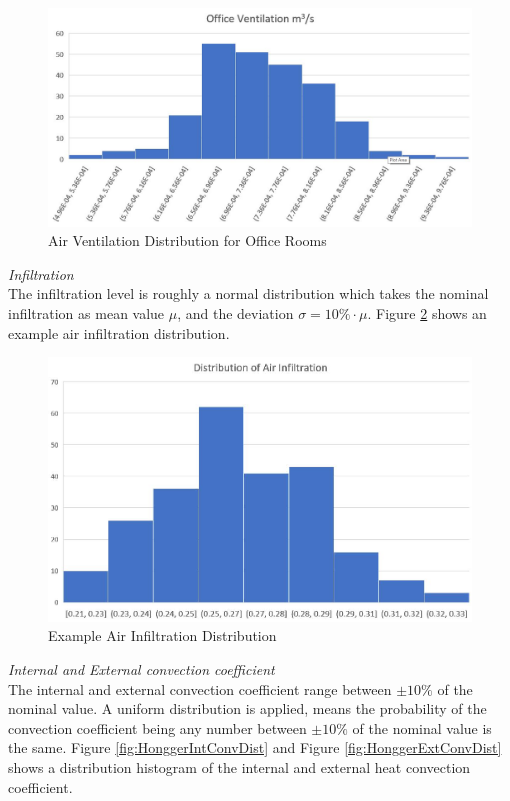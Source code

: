\documentclass[a4paper, oneside]{discothesis}
\begin{document}
			\begin{figure}[ht!]
			\centering
			\includegraphics[scale=0.45]{Office_Vent.jpg}
			\caption{Air Ventilation Distribution for Office Rooms}
			\label{fig:VentDist}
			\end{figure}
						
		\textit{Infiltration}\\
			The infiltration level is roughly a normal distribution which takes the nominal infiltration as mean value $\mu$, and the deviation $\sigma = 10\% \cdot \mu$. Figure \ref{fig:EXPAirInfiltration_Sumatra} shows an example air infiltration distribution.\\

			\begin{figure}[ht!]
			\centering
			\includegraphics[scale=0.5]{Example_Normal_Distribution.jpg}
			\caption{Example Air Infiltration Distribution }
			\label{fig:EXPAirInfiltration_Sumatra}
			\end{figure}
		
		\textit{Internal and External convection coefficient}\\
			The internal and external convection coefficient range between $\pm 10\%$ of the nominal value.
			A uniform distribution is applied, means the probability of the convection coefficient being any number between $\pm 10\%$ of the nominal value is the same. Figure \ref{fig:HonggerIntConvDist} and Figure \ref{fig:HonggerExtConvDist} shows a distribution histogram of the internal and external heat convection coefficient.\\
\end{document}
